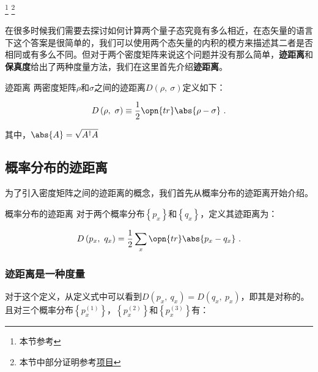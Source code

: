 
\footnote{本节参考\cite{量子信息}}
\footnote{本节中部分证明参考\href{https://github.com/goropikari/SolutionQCQINielsenChuang}{项目}}


在很多时候我们需要去探讨如何计算两个量子态究竟有多么相近，在态矢量的语言下这个答案是很简单的，我们可以使用两个态矢量的内积的模方来描述其二者是否相同或有多么不同。但对于两个密度矩阵来说这个问题并没有那么简单，\textbf{迹距离}和\textbf{保真度}给出了两种度量方法，我们在这里首先介绍\textbf{迹距离}。

\begin{definition}{迹距离}
两密度矩阵$\rho$和$\sigma$之间的迹距离$D\left(\rho,~\sigma\right)$定义如下：

\begin{equation}
D\left(\rho,~\sigma\right) \equiv \frac{1}{2} \opn{tr}\abs{\rho - \sigma}~.
\end{equation}

其中，$\abs{A} = \sqrt{A^\dagger A}$

\end{definition}

\subsection{概率分布的迹距离}

为了引入密度矩阵之间的迹距离的概念，我们首先从概率分布的迹距离开始介绍。

\begin{definition}{概率分布的迹距离}
对于两个概率分布$\left\{ p_x \right\}$和$\left\{q_x\right\}$，定义其迹距离为：

\begin{equation}
D\left( p_x,~q_x \right) = \frac{1}{2}\sum_x\opn{tr}\abs{p_x - q_x}~.
\end{equation}

\end{definition}

\subsubsection{迹距离是一种度量}

对于这个定义，从定义式中可以看到$D\left(p_x,~q_x\right) = D\left(q_x,~p_x\right)$，即其是对称的。且对三个概率分布$\left\{p_x^{(1)}\right\}$，$\left\{p_x^{(2)}\right\}$和$\left\{p_x^{(3)}\right\}$有：


